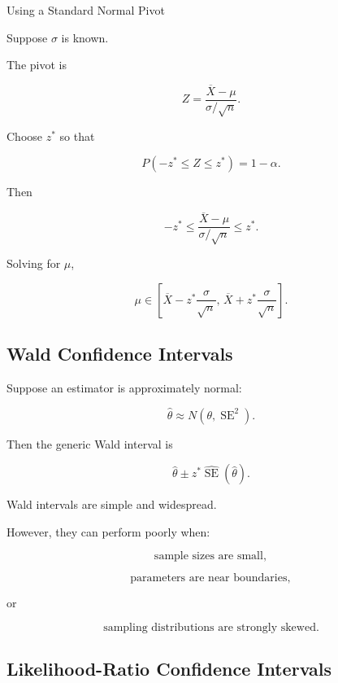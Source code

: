 \begin{workedexamplebox}{Using a Standard Normal Pivot}

Suppose \(\sigma\) is known.

The pivot is

\[
Z
=
\frac{
\overline{X}-\mu
}{
\sigma/\sqrt{n}
}.
\]

Choose \(z^*\) so that

\[
P(-z^*\leq Z\leq z^*)=1-\alpha.
\]

Then

\[
-z^*
\leq
\frac{
\overline{X}-\mu
}{
\sigma/\sqrt{n}
}
\leq
z^*.
\]

Solving for \(\mu\),

\begin{answerbox}
\[
\boxed{
\mu
\in
\left[
\overline{X}
-
z^*\frac{\sigma}{\sqrt{n}},
\,
\overline{X}
+
z^*\frac{\sigma}{\sqrt{n}}
\right].
}
\]
\end{answerbox}

\end{workedexamplebox}

\subsection{Wald Confidence Intervals}
\label{subsec:wald-confidence-intervals}

Suppose an estimator is approximately normal:

\[
\widehat{\theta}
\approx
N
(
\theta,
\operatorname{SE}^2
).
\]

Then the generic Wald interval is

\[
\boxed{
\widehat{\theta}
\pm
z^*
\widehat{\operatorname{SE}}
(
\widehat{\theta}
).
}
\]

Wald intervals are simple and widespread.

However, they can perform poorly when:

\[
\boxed{
\text{sample sizes are small},
}
\]

\[
\boxed{
\text{parameters are near boundaries},
}
\]

or

\[
\boxed{
\text{sampling distributions are strongly skewed}.
}
\]

\subsection{Likelihood-Ratio Confidence Intervals}
\label{subsec:likelihood-ratio-ci}

